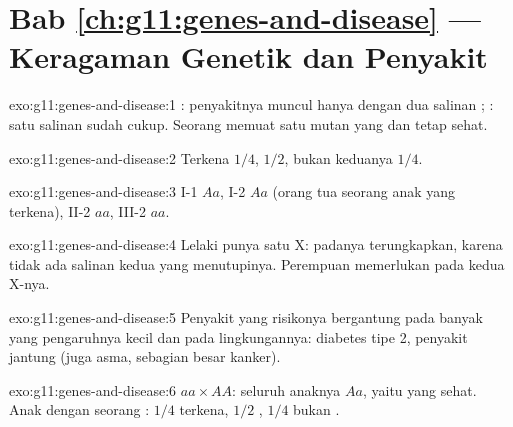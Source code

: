 \section*{Bab \ref{ch:g11:genes-and-disease} --- Keragaman Genetik dan Penyakit}

\begin{solution}{exo:g11:genes-and-disease:1}
: penyakitnya muncul hanya dengan dua salinan ; :
satu salinan sudah cukup. Seorang  memuat satu  mutan yang
 dan tetap sehat.
\end{solution}

\begin{solution}{exo:g11:genes-and-disease:2}
Terkena $1/4$,  $1/2$, bukan keduanya $1/4$.
\end{solution}

\begin{solution}{exo:g11:genes-and-disease:3}
I-1 $Aa$, I-2 $Aa$ (orang tua seorang anak yang terkena), II-2 $aa$,
III-2 $aa$.
\end{solution}

\begin{solution}{exo:g11:genes-and-disease:4}
Lelaki punya satu  X:   padanya terungkapkan, karena
tidak ada salinan kedua yang menutupinya. Perempuan memerlukan 
pada kedua  X-nya.
\end{solution}

\begin{solution}{exo:g11:genes-and-disease:5}
Penyakit yang risikonya bergantung pada banyak  yang pengaruhnya
kecil dan pada lingkungannya: diabetes tipe 2, penyakit jantung (juga
asma, sebagian besar kanker).
\end{solution}

\begin{solution}{exo:g11:genes-and-disease:6}
$aa \times AA$: seluruh anaknya $Aa$, yaitu  yang sehat. Anak
 dengan seorang : $1/4$ terkena, $1/2$ , $1/4$
bukan .
\end{solution}

